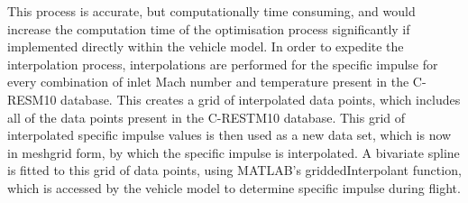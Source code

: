 This process is accurate, but computationally time consuming, and would increase the computation time of the optimisation process significantly if implemented directly within the vehicle model.
 In order to expedite the interpolation process, interpolations are performed for the specific impulse for every combination of inlet Mach number and temperature present in the C-RESM10 database. This creates a grid of interpolated data points, which includes all of the data points present in the C-RESTM10 database. This grid of interpolated specific impulse values is then used as a new data set, which is now in \textsf{meshgrid} form, by which the specific impulse is interpolated. A bivariate spline is fitted to this grid of data points, using MATLAB's \textsf{griddedInterpolant} function, which is accessed by the vehicle model to determine specific impulse during flight.  







